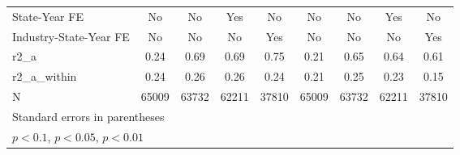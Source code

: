 {\begin{tabular}{l*{8}{c}}
\addlinespace
State-Year FE       &          No         &          No         &         Yes         &          No         &          No         &          No         &         Yes         &          No         \\
\addlinespace
Industry-State-Year FE&          No         &          No         &          No         &         Yes         &          No         &          No         &          No         &         Yes         \\
\midrule
r2\_a                &        0.24         &        0.69         &        0.69         &        0.75         &        0.21         &        0.65         &        0.64         &        0.61         \\
r2\_a\_within         &        0.24         &        0.26         &        0.26         &        0.24         &        0.21         &        0.25         &        0.23         &        0.15         \\
N                   &       65009         &       63732         &       62211         &       37810         &       65009         &       63732         &       62211         &       37810         \\
\bottomrule
\multicolumn{9}{l}{\footnotesize Standard errors in parentheses}\\
\multicolumn{9}{l}{\footnotesize \sym{*} \(p<0.1\), \sym{**} \(p<0.05\), \sym{***} \(p<0.01\)}\\
\end{tabular}
}
